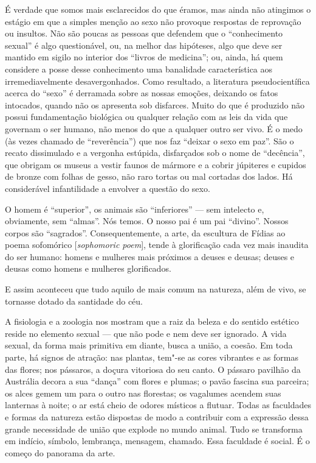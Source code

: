 É verdade que somos mais esclarecidos do que éramos, mas ainda não
atingimos o estágio em que a simples menção ao sexo não provoque
respostas de reprovação ou insultos. Não são poucas as pessoas que
defendem que o ``conhecimento sexual'' é algo questionável, ou, na
melhor das hipóteses, algo que deve ser mantido em sigilo no interior
dos ``livros de medicina''; ou, ainda, há quem considere a posse desse
conhecimento uma banalidade característica aos irremediavelmente
desavergonhados. Como resultado, a literatura pseudocientífica acerca do
``sexo'' é derramada sobre as nossas emoções, deixando os fatos
intocados, quando não os apresenta sob disfarces. Muito do que é
produzido não possui fundamentação biológica ou qualquer relação com as
leis da vida que governam o ser humano, não menos do que a qualquer outro ser
vivo. É o medo (às vezes chamado de ``reverência'') que nos faz ``deixar
o sexo em paz''. São o recato dissimulado e a vergonha estúpida,
disfarçados sob o nome de ``decência'', que obrigam os museus a vestir
faunos de mármore e a cobrir júpiteres e cupidos de bronze com folhas de
gesso, não raro tortas ou mal cortadas dos lados. Há considerável
infantilidade a envolver a questão do sexo.

O homem é ``superior'', os animais são ``inferiores'' --- sem intelecto
e, obviamente, sem ``almas''. Nós temos. O nosso pai é um pai
``divino''. Nossos corpos são ``sagrados''. Consequentemente, a arte, da
escultura de Fídias ao poema sofomórico {[}\emph{sophomoric poem}{]},
tende à glorificação cada vez mais inaudita do ser humano: homens e mulheres
mais próximos a deuses e deusas; deuses e deusas como homens e mulheres
glorificados.

E assim aconteceu que tudo aquilo de mais comum na natureza, além de
vivo, se tornasse dotado da santidade do céu.

\asterisc

A fisiologia e a zoologia nos mostram que a raiz da beleza e do sentido
estético reside no elemento sexual --- que não pode e nem deve ser
ignorado. A vida sexual, da forma mais primitiva em diante, busca a
união, a coesão. Em toda parte, há signos de atração: nas plantas,
tem"-se as cores vibrantes e as formas das flores; nos pássaros, a doçura
vitoriosa do seu canto. O pássaro pavilhão da Austrália decora a sua
``dança'' com flores e plumas; o pavão fascina sua parceira; os alces
gemem um para o outro nas florestas; os vagalumes acendem suas lanternas
à noite; o ar está cheio de odores místicos a flutuar. Todas as
faculdades e formas da natureza estão dispostas de modo a contribuir com
a expressão dessa grande necessidade de união que explode no mundo
animal. Tudo se transforma em indício, símbolo, lembrança, mensagem,
chamado. Essa faculdade é social. É o começo do panorama da arte.

